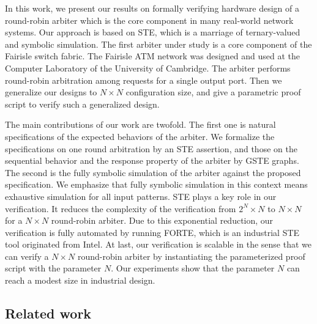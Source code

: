 \documentclass[final]{IEEEtran}
\begin{document}
In this work, we present our results on formally verifying hardware
design of a round-robin arbiter which is the core component in many
real-world network systems. Our approach is based on STE, which is a
marriage of ternary-valued and
symbolic simulation. The first arbiter under study  is a core component of the Fairisle %
switch fabric. %
The Fairisle ATM network was designed and used at the Computer
Laboratory of the University of Cambridge. The arbiter performs
round-robin arbitration among requests for a single output port.
Then we generalize our designs to $N \times N$ configuration size,
and give a parametric proof  script to verify such a generalized
design. %

The main contributions of our work are twofold. The first one is
natural specifications of the expected behaviors of the arbiter. We
formalize the specifications on   one round arbitration by an STE
assertion, and those on the sequential behavior  and the response
property of the arbiter by GSTE graphs. The second is the fully
symbolic simulation of the arbiter against the proposed
specification. We emphasize that   fully symbolic simulation in this
context means   exhaustive simulation for all   input patterns. STE
plays a key role in our verification. It reduces the complexity of
the verification from $2^{N}\times N$ to $N\times N$ for a $N\times
N$ round-robin arbiter. Due to this exponential reduction,
our verification is fully automated by
running FORTE, which is an industrial STE tool originated from
Intel. At last, our verification is scalable in the sense that we
can verify a $N \times N$ round-robin arbiter by instantiating the
parameterized proof script
with the parameter $N$. %
Our experiments show that the parameter $N$ can reach a modest size
in   industrial design.



%

\subsection{Related work}
\end{document}
